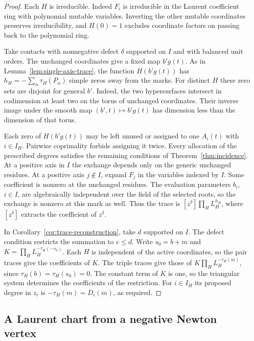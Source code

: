 \documentclass[11pt,reqno]{amsart}
\numberwithin{equation}{section}
\theoremstyle{definition}
\theoremstyle{remark}
\begin{document}
\begin{proof}
Each \(H\) is irreducible. Indeed \(F_i\) is irreducible in the
Laurent coefficient ring with polynomial mutable variables. Inverting
the other mutable coordinates preserves irreducibility, and \(H(0)=1\)
excludes coordinate factors on passing back to the polynomial ring.

Take contacts with nonnegative defect \(\delta\) supported on \(I\)
and with balanced unit orders. The unchanged coordinates give a fixed
map \(b'g(t)\). As in Lemma~\ref{lem:single-axis-trace}, the function
\(H(b'g(t))\) has \(h_H=-\sum_\alpha\tau_H(P_\alpha)\) simple zeros
away from the marks. For distinct \(H\) these zero sets are disjoint
for general \(b'\). Indeed, the two hypersurfaces intersect in
codimension at least two on the torus of unchanged coordinates.
Their inverse image under the smooth map \((b',t)\mapsto b'g(t)\)
has dimension less than the dimension of that torus.

Each zero of \(H(b'g(t))\) may be left unused or assigned to one
\(A_i(t)\) with \(i\in I_H\). Pairwise coprimality forbids assigning
it twice. Every allocation of the prescribed degrees satisfies the
remaining conditions of Theorem~\ref{thm:incidence}. At a positive
axis in \(I\) the exchange depends only on the generic unchanged
residues. At a positive axis \(j\notin I\), expand \(F_j\) in the
variables indexed by \(I\). Some coefficient is nonzero at the
unchanged residues. The evaluation parameters \(b_i\), \(i\in I\),
are algebraically independent over the field of the selected roots,
so the exchange is nonzero at this mark as well. Thus the trace is
\([z^\delta]\prod_H L_H^{h_H}\), where \([z^\delta]\) extracts the
coefficient of \(z^\delta\).

In Corollary~\ref{cor:trace-reconstruction}, take \(d\) supported on
\(I\). The defect condition restricts the summation to \(e\le d\).
Write \(s_0=b+m\) and \(K=\prod_H L_H^{-\tau_H(-s_0)}\).
Each \(H\) is independent of the active coordinates, so the pair
traces give the coefficients of \(K\). The triple traces give those
of \(K\prod_H L_H^{-\tau_H(m)}\), since
\(\tau_H(b)=\tau_H(s_0)=0\). The constant term of \(K\) is one,
so the triangular system determines the coefficients of the
restriction. For \(i\in I_H\) its proposed degree in \(z_i\) is
\(-\tau_H(m)=D_i(m)\), as required.
\end{proof}

\subsection{A Laurent chart from a negative Newton vertex}
\end{document}
